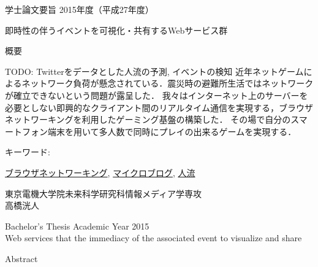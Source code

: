 \newpage
\pagestyle{plain}
\begin{center}
\LARGE{学士論文要旨 \hspace{10mm} 2015年度（平成27年度）}\\

\vspace{10mm}

\LARGE{即時性の伴うイベントを可視化・共有するWebサービス群}\\
\end{center}

\begin{center}
概要\\
\end{center}

TODO: Twitterをデータとした人流の予測, イベントの検知
 近年ネットゲームによるネットワーク負荷が懸念されている．震災時の避難所生活ではネットワークが確立できないという問題が露呈した．
我々はインターネット上のサーバーを必要としない即興的なクライアント間のリアルタイム通信を実現する，ブラウザネットワーキングを利用したゲーミング基盤の構築した．
 その場で自分のスマートフォン端末を用いて多人数で同時にプレイの出来るゲームを実現する．

\begin{flushleft}キーワード:\\
\end{flushleft}
{\underline{ブラウザネットワーキング}, \underline{マイクロブログ}, \underline{人流}}


\begin{center}
\vspace{10mm}
\begin{flushright}\large 東京電機大学院未来科学研究科情報メディア学専攻\\
\LARGE 高橋洸人\\
\end{flushright}
\end{center}

\newpage

\begin{center}
\LARGE{Bachelor's Thesis Academic Year 2015}\\

\vspace{10mm}
\LARGE{Web services that the immediacy of the associated event to visualize and share}\\
\end{center}
\begin{center}
Abstract\\
\end{center}

